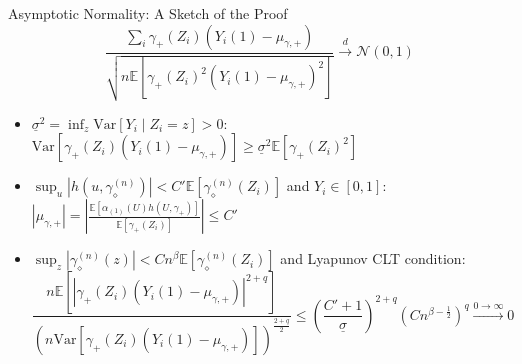  \begin{frame}{Asymptotic Normality: A Sketch of the Proof}
    $$
    \frac{\sum_{i}\gamma_{+}\left(Z_{i}\right)\left(Y_{i}\left(1\right)-\mu_{\gamma,+}\right)}{\sqrt{n\mathbb{E}\left[\gamma_{+}\left(Z_{i}\right)^{2}\left(Y_{i}\left(1\right)-\mu_{\gamma,+}\right)^{2}\right]}} \xrightarrow{d} \mathcal{N}(0,1)
    $$

    \begin{itemize}
        \footnotesize
        \item \textcolor{mygreen}{$\boxed{\underline{\sigma}^{2} = \inf_{z}\mathrm{Var}\left[Y_{i}\mid Z_{i}=z\right]>0}$}: $\mathrm{Var}\left[\gamma_{+}\left(Z_{i}\right)\left(Y_{i}\left(1\right)-\mu_{\gamma,+}\right)\right] \geq \underline{\sigma}^{2} \mathbb{E}\left[\gamma_{+}\left(Z_{i}\right)^{2}\right]$
        \item \textcolor{mygreen}{${\boxed{\sup_{u}\left|h\left(u,\gamma_{\diamond}^{\left(n\right)}\right)\right|<C'\mathbb{E}\left[\gamma_{\diamond}^{\left(n\right)}\left(Z_{i}\right)\right]}}$} and \textcolor{mygreen}{$\boxed{Y_{i}\in\left[0,1\right]}$}: $\left|\mu_{\gamma,+}\right|=\left|\frac{\mathbb{E}\left[\alpha_{\left(1\right)}\left(U\right)h\left(U,\gamma_{+}\right)\right]}{\mathbb{E}\left[\gamma_{+}\left(Z_{i}\right)\right]}\right| \leq C'$
        \item \textcolor{mygreen}{$\boxed{\sup_{z}\left|\gamma_{\diamond}^{\left(n\right)}\left(z\right)\right|<Cn^{\beta}  \mathbb{E} \left[\gamma_{\diamond}^{\left(n\right)}\left(Z_{i}\right)\right]}$} and \textcolor{mygreen}{Lyapunov CLT condition}: {\scriptsize $$\frac{n\mathbb{E}\left[\left|\gamma_{+}\left(Z_{i}\right)\left(Y_{i}\left(1\right)-\mu_{\gamma,+}\right)\right|^{2+q}\right]}{\left(n\mathrm{Var}\left[\gamma_{+}\left(Z_{i}\right)\left(Y_{i}\left(1\right)-\mu_{\gamma,+}\right)\right]\right)^{\frac{2+q}{2}}} \leq\left(\frac{C'+1}{\underline{\sigma}}\right)^{2+q}\left(Cn^{\beta-\frac{1}{2}}\right)^{q}\xrightarrow{0\rightarrow\infty} 0$$}
    \end{itemize}
 \end{frame}

